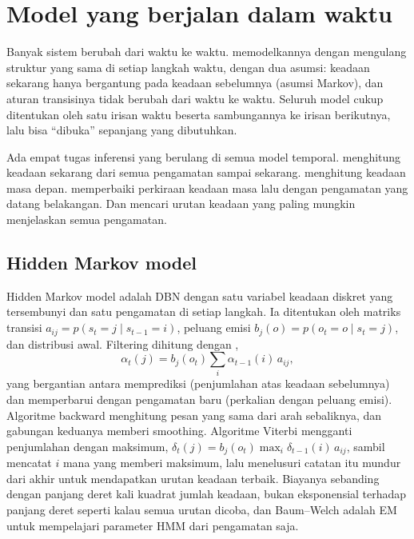 \section{Model yang berjalan dalam waktu}

Banyak sistem berubah dari waktu ke waktu.  memodelkannya dengan
mengulang struktur yang sama di setiap langkah waktu, dengan dua asumsi: keadaan sekarang hanya
bergantung pada keadaan sebelumnya (asumsi Markov), dan aturan transisinya tidak berubah dari waktu
ke waktu. Seluruh model cukup ditentukan oleh satu irisan waktu beserta sambungannya ke irisan
berikutnya, lalu bisa ``dibuka'' sepanjang yang dibutuhkan.

Ada empat tugas inferensi yang berulang di semua model temporal.  menghitung
keadaan sekarang dari semua pengamatan sampai sekarang.  menghitung keadaan masa
depan.  memperbaiki perkiraan keadaan masa lalu dengan pengamatan yang datang
belakangan. Dan  mencari urutan keadaan yang paling mungkin
menjelaskan semua pengamatan.

\subsection{Hidden Markov model}

Hidden Markov model \citep{rabiner1989} adalah DBN dengan satu variabel keadaan diskret yang tersembunyi
dan satu pengamatan di setiap langkah. Ia ditentukan oleh matriks transisi $a_{ij}=p(s_t=j\mid s_{t-1}=i)$,
peluang emisi $b_j(o)=p(o_t=o\mid s_t=j)$, dan distribusi awal. Filtering dihitung dengan
,
\begin{equation}
\alpha_t(j)=b_j(o_t)\sum_i\alpha_{t-1}(i)\,a_{ij},
\end{equation}
yang bergantian antara memprediksi (penjumlahan atas keadaan sebelumnya) dan memperbarui dengan
pengamatan baru (perkalian dengan peluang emisi). Algoritme backward menghitung pesan yang sama dari
arah sebaliknya, dan gabungan keduanya memberi smoothing. Algoritme Viterbi mengganti penjumlahan
dengan maksimum, $\delta_t(j)=b_j(o_t)\max_i\delta_{t-1}(i)\,a_{ij}$, sambil mencatat $i$ mana yang memberi maksimum,
lalu menelusuri catatan itu mundur dari akhir untuk mendapatkan urutan keadaan terbaik. Biayanya sebanding dengan
panjang deret kali kuadrat jumlah keadaan, bukan eksponensial terhadap panjang deret seperti kalau semua urutan dicoba, dan Baum--Welch adalah EM untuk mempelajari
parameter HMM dari pengamatan saja.

